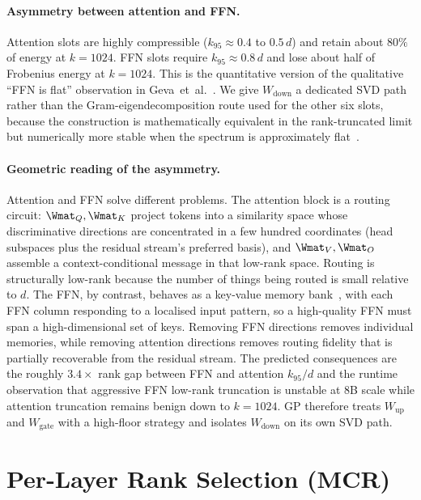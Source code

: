 \documentclass[11pt]{article}
\begin{document}
\paragraph{Asymmetry between attention and FFN.}
Attention slots are highly compressible ($k_{95}\approx 0.4$ to $0.5\,d$)
and retain about $80\%$ of energy at $k{=}1024$. FFN slots require
$k_{95}\approx 0.8\,d$ and lose about half of Frobenius energy at
$k{=}1024$. This is the quantitative version of the qualitative
``FFN is flat'' observation in Geva~et~al.~\cite{geva2021ffn}. We give
$W_\text{down}$ a dedicated SVD path rather than the
Gram-eigendecomposition route used for the other six slots, because
the construction is mathematically equivalent in the rank-truncated
limit but numerically more stable when the spectrum is approximately
flat~\cite{golub2013matrix,eckart1936}.

\paragraph{Geometric reading of the asymmetry.}
Attention and FFN solve different problems. The attention block is a
routing circuit: $\Wmat_Q,\Wmat_K$ project tokens into a similarity
space whose discriminative directions are concentrated in a few hundred
coordinates (head subspaces plus the residual stream's preferred basis),
and $\Wmat_V,\Wmat_O$ assemble a context-conditional message in that
low-rank space. Routing is structurally low-rank because the number of
things being routed is small relative to $d$. The FFN, by contrast,
behaves as a key-value memory bank~\cite{geva2021ffn}, with each FFN
column responding to a localised input pattern, so a high-quality FFN
must span a high-dimensional set of keys. Removing FFN directions removes
individual memories, while removing attention directions removes routing
fidelity that is partially recoverable from the residual stream. The
predicted consequences are the roughly $3.4\times$ rank gap between
FFN and attention $k_{95}/d$ and the runtime observation that aggressive
FFN low-rank truncation is unstable at 8B scale while attention
truncation remains benign down to $k{=}1024$. GP therefore treats
$W_\text{up}$ and $W_\text{gate}$ with a high-floor strategy and isolates
$W_\text{down}$ on its own SVD path.

\section{Per-Layer Rank Selection (MCR)}
\label{sec:mcr}
\end{document}

